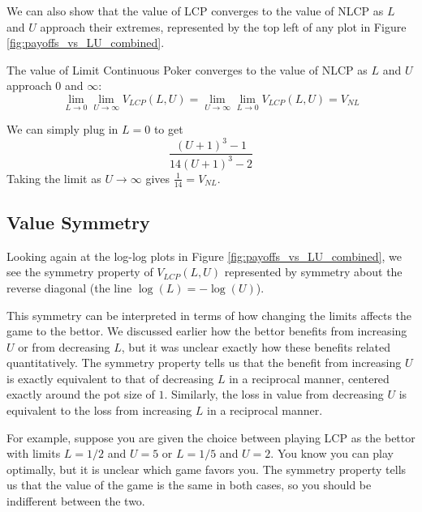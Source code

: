 \documentclass[../../main/main.tex]{subfiles}
\begin{document}
We can also show that the value of LCP converges to the value of NLCP as $L$ and $U$ approach their extremes, represented by the top left of any plot in Figure \ref{fig:payoffs_vs_LU_combined}.

\begin{theorem}
    The value of Limit Continuous Poker converges to the value of NLCP as $L$ and $U$ approach $0$ and $\infty$:
\[
\lim_{L \to 0} \lim_{U \to \infty} V_{LCP}(L, U) = \lim_{U \to \infty} \lim_{L \to 0} V_{LCP}(L, U) = V_{NL}
\]
\end{theorem}
\begin{customproof}
    We can simply plug in $L=0$ to get
    $$\frac{(U+1)^3-1}{14 (U+1)^3-2}$$
    Taking the limit as $U \to \infty$ gives $\frac{1}{14} = V_{NL}$.
\end{customproof}

\subsection{Value Symmetry}

Looking again at the log-log plots in Figure \ref{fig:payoffs_vs_LU_combined}, we see the symmetry property of $V_{LCP}(L, U)$ represented by symmetry about the reverse diagonal (the line $\log(L) = -\log(U)$). 

This symmetry can be interpreted in terms of how changing the limits affects the game to the bettor. We discussed earlier how the bettor benefits from increasing $U$ or from decreasing $L$, but it was unclear exactly how these benefits related quantitatively. The symmetry property tells us that the benefit from increasing $U$ is exactly equivalent to that of decreasing $L$ in a reciprocal manner, centered exactly around the pot size of $1$. Similarly, the loss in value from decreasing $U$ is equivalent to the loss from increasing $L$ in a reciprocal manner.

For example, suppose you are given the choice between playing LCP as the bettor with limits $L=1/2$ and $U=5$ or $L=1/5$ and $U=2$. You know you can play optimally, but it is unclear which game favors you. The symmetry property tells us that the value of the game is the same in both cases, so you should be indifferent between the two.
\end{document}
